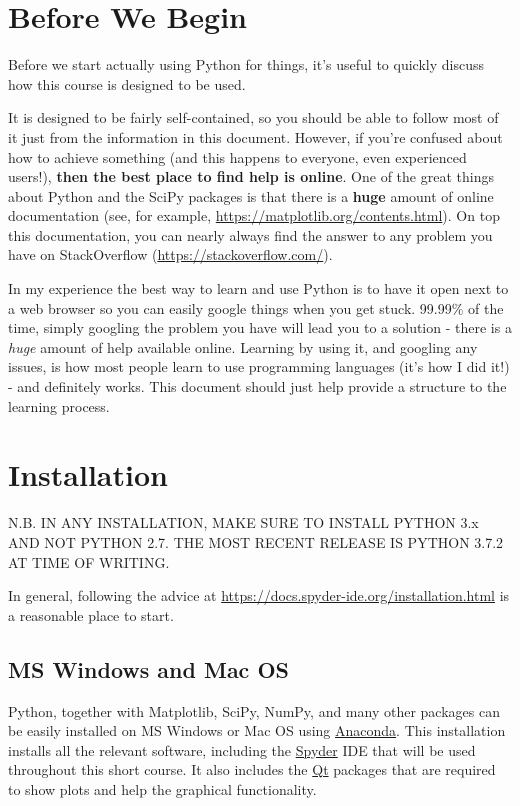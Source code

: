 \documentclass[10pt,a4paper]{memoir}
\begin{document}
\section*{Before We Begin}
Before we start actually using Python for things, it's useful to quickly discuss how this course is designed to be used. 

It is designed to be fairly self-contained, so you should be able to follow most of it just from the information in this document. However, if you're confused about how to achieve something (and this happens to everyone, even experienced users!), \textbf{then the best place to find help is online}. One of the great things about Python and the SciPy packages is that there is a \textbf{huge} amount of online documentation (see, for example, \url{https://matplotlib.org/contents.html}). On top this documentation, you can nearly always find the answer to any problem you have on StackOverflow (\url{https://stackoverflow.com/}). 

In my experience the best way to learn and use Python is to have it open next to a web browser so you can easily google things when you get stuck. 99.99\% of the time, simply googling the problem you have will lead you to a solution - there is a \emph{huge} amount of help available online. Learning by using it, and googling any issues, is how most people learn to use programming languages (it's how I did it!) - and definitely works. This document should just help provide a structure to the learning process.
\vspace*{\fill}

\section{Installation}
N.B. IN ANY INSTALLATION, MAKE SURE TO INSTALL PYTHON 3.x AND NOT PYTHON 2.7. THE MOST RECENT RELEASE IS PYTHON 3.7.2 AT TIME OF WRITING.

In general, following the advice at \url{https://docs.spyder-ide.org/installation.html} is a reasonable place to start.
\subsection{MS Windows and Mac OS}
Python, together with Matplotlib, SciPy, NumPy, and many other packages can be easily installed on MS Windows or Mac OS using \href{https://www.anaconda.com/download/#download}{Anaconda}. This installation installs all the relevant software, including the \href{www.spyder-ide.org}{Spyder} IDE that will be used throughout this short course. It also includes the \href{www.qt.io/qt-for-python}{Qt} packages that are required to show plots and help the graphical functionality.
\end{document}
